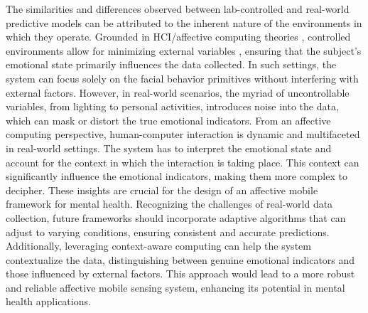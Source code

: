 The similarities and differences observed between lab-controlled and real-world predictive models can be attributed to the inherent nature of the environments in which they operate. Grounded in HCI/affective computing theories \cite{picard1999affective}, controlled environments allow for minimizing external variables \cite{campbell2015experimental}, ensuring that the subject's emotional state primarily influences the data collected. In such settings, the system can focus solely on the facial behavior primitives without interfering with external factors. However, in real-world scenarios, the myriad of uncontrollable variables, from lighting to personal activities, introduces noise into the data, which can mask or distort the true emotional indicators. From an affective computing perspective, human-computer interaction is dynamic and multifaceted in real-world settings. The system has to interpret the emotional state and account for the context in which the interaction is taking place. This context can significantly influence the emotional indicators, making them more complex to decipher. These insights are crucial for the design of an affective mobile framework for mental health. Recognizing the challenges of real-world data collection, future frameworks should incorporate adaptive algorithms that can adjust to varying conditions, ensuring consistent and accurate predictions. Additionally, leveraging context-aware computing can help the system contextualize the data, distinguishing between genuine emotional indicators and those influenced by external factors. This approach would lead to a more robust and reliable affective mobile sensing system, enhancing its potential in mental health applications.

